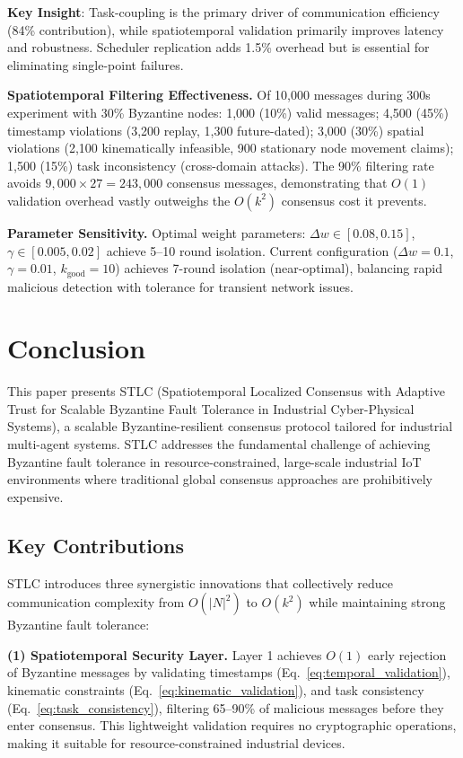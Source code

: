 \documentclass[lettersize,journal]{IEEEtran}
\begin{document}
\textbf{Key Insight}: Task-coupling is the primary driver of communication 
efficiency (84\% contribution), while spatiotemporal validation primarily 
improves latency and robustness. Scheduler replication adds 1.5\% overhead 
but is essential for eliminating single-point failures.

\textbf{Spatiotemporal Filtering Effectiveness.} Of 10,000 messages during 
300s experiment with 30\% Byzantine nodes: 1,000 (10\%) valid messages; 
4,500 (45\%) timestamp violations (3,200 replay, 1,300 future-dated); 
3,000 (30\%) spatial violations (2,100 kinematically infeasible, 900 
stationary node movement claims); 1,500 (15\%) task inconsistency 
(cross-domain attacks). The 90\% filtering rate avoids 
$9,000 \times 27 = 243,000$ consensus messages, demonstrating that $O(1)$ 
validation overhead vastly outweighs the $O(k^2)$ consensus cost it 
prevents.

\textbf{Parameter Sensitivity.} Optimal weight parameters: 
$\Delta w \in [0.08, 0.15]$, $\gamma \in [0.005, 0.02]$ achieve 5--10 
round isolation. Current configuration ($\Delta w=0.1$, $\gamma=0.01$, 
$k_{\text{good}}=10$) achieves 7-round isolation (near-optimal), balancing 
rapid malicious detection with tolerance for transient network issues.

\section{Conclusion}
\label{sec:conclusion}
This paper presents STLC (Spatiotemporal Localized Consensus with Adaptive Trust for Scalable Byzantine Fault Tolerance in Industrial Cyber-Physical Systems), a scalable Byzantine-resilient consensus protocol tailored for industrial multi-agent systems. STLC addresses the fundamental challenge of achieving Byzantine fault tolerance in resource-constrained, large-scale industrial IoT environments where traditional global consensus approaches are prohibitively expensive.

\subsection{Key Contributions}

\label{sec:contributions}

STLC introduces three synergistic innovations that collectively reduce
communication complexity from $O(|N|^2)$ to $O(k^2)$ while maintaining
strong Byzantine fault tolerance:

\textbf{(1) Spatiotemporal Security Layer.} Layer 1 achieves $O(1)$ early
rejection of Byzantine messages by validating timestamps
(Eq.~\ref{eq:temporal_validation}), kinematic constraints
(Eq.~\ref{eq:kinematic_validation}), and task consistency
(Eq.~\ref{eq:task_consistency}), filtering 65--90\% of malicious messages
before they enter consensus. This lightweight validation requires no
cryptographic operations, making it suitable for resource-constrained
industrial devices.
\end{document}
